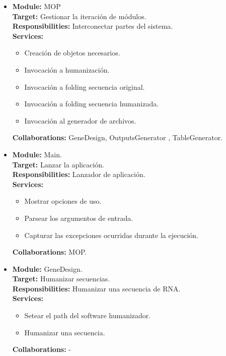 \documentclass[12pt,a4paper,spanish]{article}
\begin{document}
\begin{itemize}
    \item \textbf{Module:} MOP \\
    \textbf{Target:} Gestionar la iteración de módulos. \\
    \textbf{Responsibilities:} Interconectar partes del sistema. \\
    \textbf{Services:} 
        \begin{itemize}
            \item Creación de objetos necesarios.
            \item Invocación a humanización.
            \item Invocación a folding secuencia original.
            \item Invocación a folding secuencia humanizada.
            \item Invocación al generador de archivos.
        \end{itemize}
    \textbf{Collaborations:}	GeneDesign, OutputsGenerator , TableGenerator. \\

    \item \textbf{Module:} Main. \\
    \textbf{Target:} Lanzar la aplicación. \\
    \textbf{Responsibilities:} Lanzador de aplicación. \\
    \textbf{Services:}
        \begin{itemize}
            \item Mostrar opciones de uso.
            \item Parsear los argumentos de entrada.
            \item Capturar las excepciones ocurridas durante la ejecución.
        \end{itemize} 
    \textbf{Collaborations:} MOP. \\

    \item \textbf{Module:} GeneDesign. \\
    \textbf{Target:}  Humanizar secuencias. \\
    \textbf{Responsibilities:} Humanizar una secuencia de RNA. \\
    \textbf{Services:}
        \begin{itemize}
            \item Setear el path del software humanizador.
            \item Humanizar una secuencia.
        \end{itemize} 
    \textbf{Collaborations:}	- \\


\end{itemize}
\end{document}
